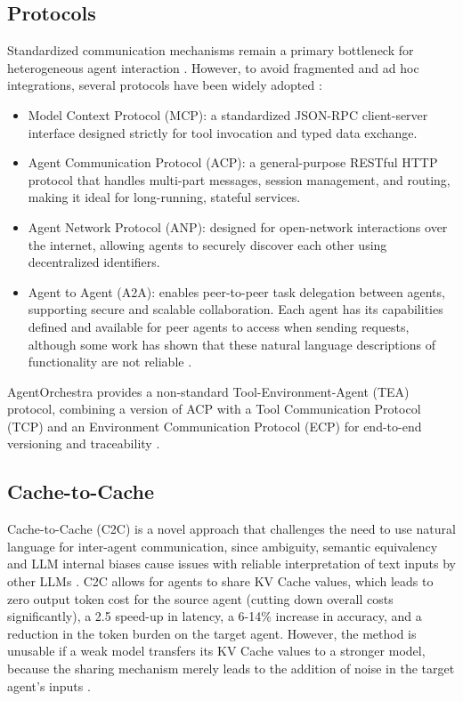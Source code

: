 \documentclass[conference]{IEEEtran}
\begin{document}
\subsection{Protocols}
Standardized communication mechanisms remain a primary bottleneck for heterogeneous agent
interaction \cite{ehtesham_survey_2025}. 
However, to avoid fragmented and ad hoc integrations, several protocols have been widely adopted
\cite{ehtesham_survey_2025}:
\begin{itemize}
	\item Model Context Protocol (MCP): a standardized JSON-RPC client-server interface 
		designed strictly for tool invocation and typed data exchange.
	\item Agent Communication Protocol (ACP): a general-purpose RESTful HTTP protocol 
		that handles multi-part messages, session management, and routing, 
		making it ideal for long-running, stateful services.
	\item Agent Network Protocol (ANP): designed for open-network interactions over the internet, 
		allowing agents to securely discover each other using decentralized identifiers.
	\item Agent to Agent (A2A): enables peer-to-peer task delegation between agents,
		supporting secure and scalable collaboration.
		Each agent has its capabilities defined and available
		for peer agents to access when sending requests, although some work has shown that these
		natural language descriptions of functionality are not reliable \cite{smirnova_cost-aware_2026}.
\end{itemize}

AgentOrchestra provides a non-standard Tool-Environment-Agent (TEA) protocol, 
combining a version of ACP with a Tool Communication Protocol (TCP) and 
an Environment Communication Protocol (ECP) for end-to-end versioning and traceability
\cite{zhang_agentorchestra_2026}.

\subsection{Cache-to-Cache}
Cache-to-Cache (C2C) is a novel approach that challenges the need to use natural language
for inter-agent communication, since ambiguity, semantic equivalency and LLM internal biases cause
issues with reliable interpretation of text inputs by other LLMs
\cite{smirnova_cost-aware_2026, cox_mapping_2025, ali_agentic_2025}.
C2C allows for agents to share KV Cache values, which leads to zero output token cost for the source
agent (cutting down overall costs significantly), a 2.5 speed-up in latency, a 6-14\% increase in
accuracy, and a reduction in the token burden on the target agent.
However, the method is unusable if a weak model transfers its KV Cache values to a stronger model,
because the sharing mechanism merely leads to the addition of noise in the 
target agent's inputs \cite{fu_cache--cache_2025}.
\end{document}

